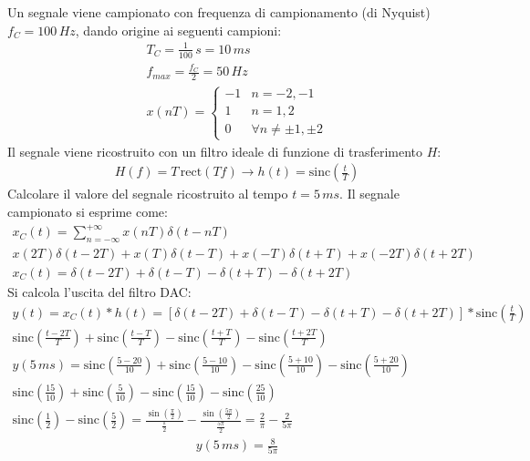 \documentclass{article}
\begin{document}
Un segnale viene campionato con frequenza di campionamento (di Nyquist) $f_C=100\,Hz$, dando origine ai seguenti campioni:
\begin{gather*}
    T_C=\displaystyle\frac{1}{100}\,s=10\,ms\\
    f_{max}=\frac{f_C}{2}=50\,Hz\\
    x(nT)=\begin{cases}
        -1&n=-2,-1\\
        1&n=1,2\\
        0&\forall n\neq\pm1,\pm2
    \end{cases}
\end{gather*}
Il segnale viene ricostruito con un filtro ideale di funzione di trasferimento $H$:
\begin{gather*}
    H(f)=T\,\mbox{rect}(Tf)\to  h(t)=\mbox{sinc}\left(\frac{t}{T}\right)
\end{gather*} 
Calcolare il valore del segnale ricostruito al tempo $t=5\,ms$. Il segnale campionato si esprime come:
\begin{gather*}
    x_C(t)=\displaystyle\sum_{n=-\infty}^{+\infty}x(nT)\delta(t-nT)\\
    x(2T)\delta(t-2T)+x(T)\delta(t-T)+x(-T)\delta(t+T)+x(-2T)\delta(t+2T)\\
    x_C(t)=\delta(t-2T)+\delta(t-T)-\delta(t+T)-\delta(t+2T)
\end{gather*}
Si calcola l'uscita del filtro DAC:
\begin{gather*}
    y(t)=x_C(t)*h(t)=\left[\delta(t-2T)+\delta(t-T)-\delta(t+T)-\delta(t+2T)\right]*\mbox{sinc}\left(\displaystyle\frac{t}{T}\right)\\
    \displaystyle\mbox{sinc}\left(\frac{t-2T}{T}\right)+\mbox{sinc}\left(\frac{t-T}{T}\right)-\mbox{sinc}\left(\frac{t+T}{T}\right)-\mbox{sinc}\left(\frac{t+2T}{T}\right)\\
    y(5\,ms)=\displaystyle\mbox{sinc}\left(\frac{5-20}{10}\right)+\mbox{sinc}\left(\frac{5-10}{10}\right)-\mbox{sinc}\left(\frac{5+10}{10}\right)-\mbox{sinc}\left(\frac{5+20}{10}\right)\\
    \displaystyle\mbox{sinc}\left(\frac{15}{10}\right)+\mbox{sinc}\left(\frac{5}{10}\right)-\mbox{sinc}\left(\frac{15}{10}\right)-\mbox{sinc}\left(\frac{25}{10}\right)\\
    \displaystyle\mbox{sinc}\left(\frac{1}{2}\right)-\mbox{sinc}\left(\frac{5}{2}\right)=\frac{\sin\left(\frac{\pi}{2}\right)}{\frac{\pi}{2}}-\frac{\sin\left(\frac{5\pi}{2}\right)}{\frac{5\pi}{2}}=\frac{2}{\pi}-\frac{2}{5\pi}
\end{gather*}
\begin{gather}
    y(5\,ms)=\displaystyle\frac{8}{5\pi}
\end{gather}
\end{document}
